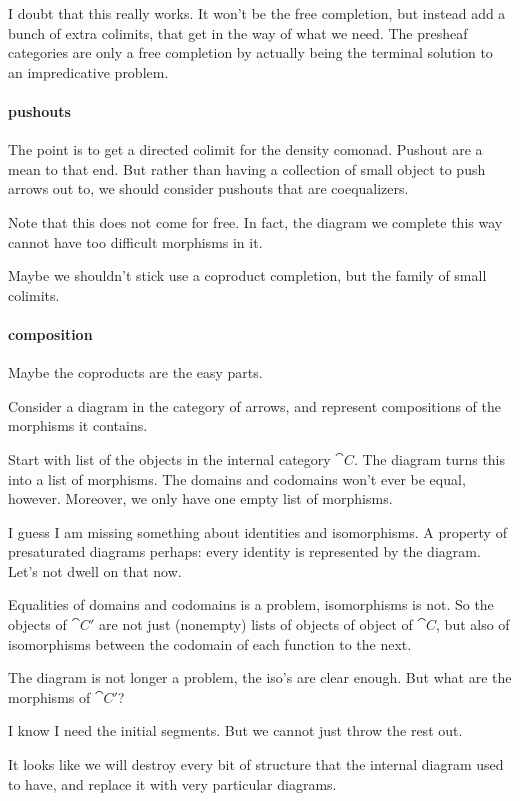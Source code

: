 \documentclass[csh.tex]{subfiles}
\begin{document}
I doubt that this really works. It won't be the free completion, but instead add a bunch of extra colimits, that get in the way of what we need. The presheaf categories are only a free completion by actually being the terminal solution to an impredicative problem.

\paragraph{pushouts}
The point is to get a directed colimit for the density comonad. Pushout are a mean to that end. But rather than having a collection of small object to push arrows out to, we should consider pushouts that are coequalizers.

Note that this does not come for free. In fact, the diagram we complete this way cannot have too difficult morphisms in it.

Maybe we shouldn't stick use a coproduct completion, but the family of small colimits.

\paragraph{composition}
Maybe the coproducts are the easy parts.

Consider a diagram in the category of arrows, and represent compositions of the morphisms it contains.

Start with list of the objects in the internal category $\cat C$. The diagram turns this into a list of morphisms. The domains and codomains won't ever be equal, however. Moreover, we only have one empty list of morphisms.

I guess I am missing something about identities and isomorphisms. A property of presaturated diagrams perhaps: every identity is represented by the diagram. Let's not dwell on that now.

Equalities of domains and codomains is a problem, isomorphisms is not. So the objects of $\cat C'$ are not just (nonempty) lists of objects of object of $\cat C$, but also of isomorphisms between the codomain of each function to the next.

The diagram is not longer a problem, the iso's are clear enough. But what are the morphisms of $\cat C'$? 

I know I need the initial segments. But we cannot just throw the rest out.

It looks like we will destroy every bit of structure that the internal diagram used to have, and replace it with very particular diagrams.
\end{document}
